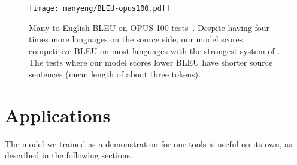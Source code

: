 \begin{figure*}[ht]
    \centering
    \texttt{[image: manyeng/BLEU-opus100.pdf]}
    \caption[Caption for LOF]{Many-to-English BLEU on OPUS-100 tests~\cite{zhang-etal-2020-multiling-nmt}. 
    Despite having four times more languages on the source side, our model scores competitive BLEU on most languages with the strongest system of \citet{zhang-etal-2020-multiling-nmt}. The tests where our model scores lower BLEU have shorter source sentences (mean length of about three tokens).}
    \label{fig:test-bleu}
\end{figure*}

\begin{comment}
\begin{subfigure}[t]{0.68\textwidth}
        \centering
        \texttt{[image: manyeng/BLEU-nttalksv1.pdf]}
    \end{subfigure}%
    ~ 
    \begin{subfigure}[t]{0.31\textwidth}
        \centering
        \texttt{[image: img/BLEU-wmt-etc.pdf]}
    \end{subfigure}
     TED Talks~\cite{qi-etal-2018-pretrainemb}, WMT~\cite{barrault-etal-2019-findings}, UNv1~\cite{ziemski-etal-2016-unpc}, and Indian-6~\cite{post-etal-2012-constructing}.
\end{comment}



\section{Applications}
\label{sec:value}
The model we trained as a demonstration for our tools is useful on its own, as described in the following sections. 

